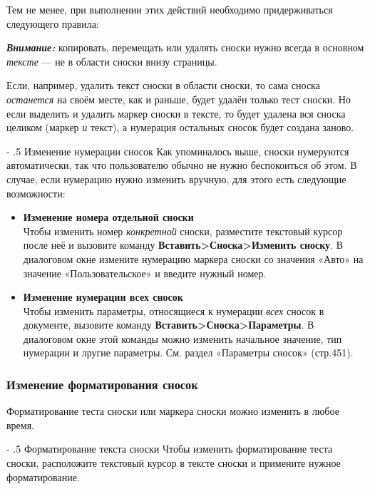 ﻿\documentclass[a4paper,10pt]{article}
\makeatletter
\renewcommand\paragraph{%
   \@startsection{paragraph}{4}{0mm}%
      {-\baselineskip}%
      {.5\baselineskip}%
      {\normalfont\normalsize\bfseries}}
\makeatother
\begin{document}
Тем не менее, при выполнении этих действий необходимо придерживаться следующего правила:
\begin{mdframed}[backgroundcolor=blue!10]
\textbf{\textit{Внимание:}} копировать, перемещать или удалять сноски нужно всегда в основном \textit{тексте} — не в области сноски внизу страницы.
\end{mdframed}

Если, например, удалить текст сноски в области сноски, то сама сноска \textit{останется} на своём месте, как и раньше, будет удалён только тест сноски. Но если выделить и удалить маркер сноски в тексте, то будет удалена вся сноска целиком (маркер \textit{и} текст), а нумерация остальных сносок будет создана заново.

\paragraph{Изменение нумерации сносок}
Как упоминалось выше, сноски нумеруются автоматически, так что пользователю обычно не нужно беспокоиться об этом. В случае, если нумерацию нужно изменить вручную, для этого есть следующие возможности:
\begin{itemize}
 \item \textbf{Изменение номера отдельной сноски}\\
 Чтобы изменить номер \textit{конкретной} сноски, разместите текстовый курсор после неё и вызовите команду \textbf{Вставить>Сноска>Изменить сноску}. В диалоговом окне измените нумерацию маркера сноски со значения «Авто» на значение «Пользовательское» и введите нужный номер.
 \item \textbf{Изменение нумерации всех сносок}\\
 Чтобы изменить параметры, относящиеся к нумерации \textit{всех} сносок в документе, вызовите команду \textbf{Вставить>Сноска>Параметры}. В диалоговом окне этой команды можно изменить начальное значение, тип нумерации и лругие параметры. См. раздел «Параметры сносок» (стр.451).
\end{itemize}

\subsubsection{Изменение форматирования сносок}
Форматирование теста сноски или маркера сноски можно изменить в любое время.

\paragraph{Форматирование текста сноски}
Чтобы изменить форматирование теста сноски, расположите текстовый курсор в тексте сноски и примените нужное форматирование.
\end{document}
